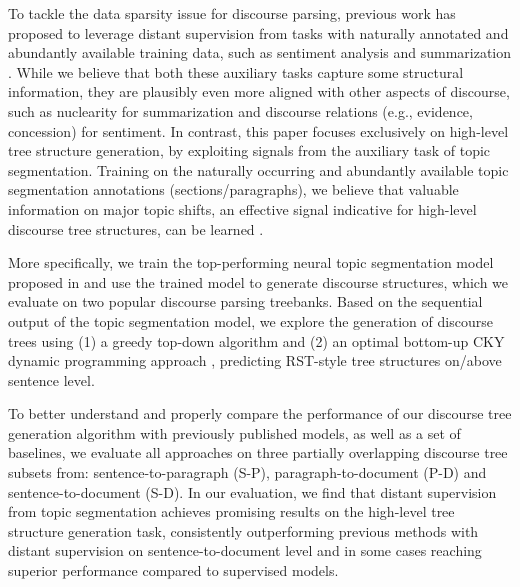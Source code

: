 \documentclass[letterpaper]{article} %
\begin{document}
To tackle the data sparsity issue for discourse parsing, previous work has proposed to leverage distant supervision
from tasks with naturally annotated and abundantly available training data, such as sentiment analysis \cite{huber-carenini-2020-mega} and summarization \cite{xiao2021predicting}. While we believe that both these auxiliary tasks capture some structural information, they are plausibly even more aligned with other aspects of discourse, such as nuclearity for summarization and discourse relations (e.g., evidence, concession) for sentiment.
In contrast, this paper focuses exclusively on high-level tree structure generation, by exploiting signals from the auxiliary task of topic segmentation. Training on the naturally occurring and abundantly available topic segmentation annotations (sections/paragraphs), we believe that valuable information on major topic shifts, an effective signal indicative for high-level discourse tree structures, can be learned \cite{stede2011discourse}.

More specifically, we train the top-performing neural topic segmentation model proposed in \citet{xing-etal-2020-improving} and use the trained model to generate discourse structures, which we evaluate on two popular discourse parsing treebanks. Based on the sequential output of the topic segmentation model, we explore the generation of discourse trees using (1) a greedy top-down algorithm and (2) an optimal bottom-up CKY dynamic programming approach \cite{jurafsky2014speech}, predicting RST-style tree structures on/above sentence level. 

To better understand and properly compare the performance of our discourse tree generation algorithm with previously published
models, as well as a set of baselines, we evaluate all approaches on three partially overlapping discourse tree subsets from: sentence-to-paragraph (S-P), paragraph-to-document (P-D) and sentence-to-document (S-D). In our evaluation, we find that distant supervision from topic segmentation achieves promising results on the high-level tree structure generation task, consistently outperforming previous methods with distant supervision on sentence-to-document level and in some cases reaching superior performance compared to supervised models.
\end{document}
